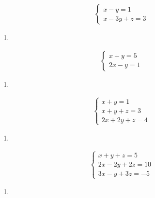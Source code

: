 \documentclass[letterpaper,10pt,italian]{jupyterBook}
\begin{document}
\begin{equation*}
\begin{split}
    \begin{cases}
    x - y = 1 \\
    x - 3y + z = 3
    \end{cases}
\end{split}
\end{equation*}\begin{enumerate}
%
\setcounter{enumi}{11}
\item {} 
\end{enumerate}
\begin{equation*}
\begin{split}
    \begin{cases}
    x + y = 5 \\
    2x - y = 1
    \end{cases}
\end{split}
\end{equation*}\begin{enumerate}
%
\setcounter{enumi}{12}
\item {} 
\end{enumerate}
\begin{equation*}
\begin{split}
    \begin{cases}
    x + y = 1 \\
    x + y + z = 3 \\
    2x + 2y + z = 4
    \end{cases}
\end{split}
\end{equation*}\begin{enumerate}
%
\setcounter{enumi}{13}
\item {} 
\end{enumerate}
\begin{equation*}
\begin{split}
    \begin{cases}
    x + y + z = 5 \\
    2x - 2y + 2z = 10 \\
    3x - y + 3z = -5
    \end{cases}
\end{split}
\end{equation*}\begin{enumerate}
%
\setcounter{enumi}{14}
\item {} 
\end{enumerate}
\end{document}

